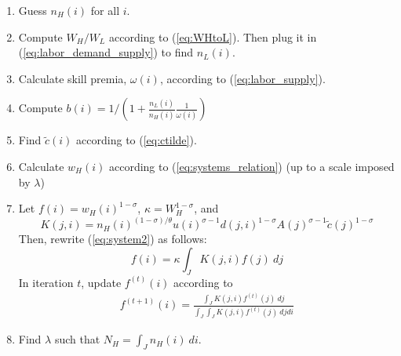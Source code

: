 \documentclass{article}
\begin{document}
\begin{enumerate}
\item Guess $n_H(i)$ for all $i$.
\item Compute $W_H/W_L$ according to (\ref{eq:WHtoL}). Then plug it in (\ref{eq:labor_demand_supply}) to find $n_L(i)$.
\item Calculate skill premia, $\omega(i)$, according to (\ref{eq:labor_supply}).
\item Compute $b(i)
= 1/(1 + \frac{n_L(i)}{n_H(i)} \frac{1}{\omega(i)})$
\item Find $\tilde{c}(i)$ according to (\ref{eq:ctilde}).
\item Calculate $w_H(i)$ according to (\ref{eq:systems_relation}) (up to a scale imposed by $\lambda$)
\item Let $f(i)=w_H(i)^{1-\sigma}$, $\kappa=W_H^{1-\sigma}$, and
\[
K(j,i) = n_H(i)^{(1-\sigma)/\theta}u(i)^{\sigma-1} d(j,i)^{1-\sigma} A(j)^{\sigma-1} \tilde{c}(j)^{1-\sigma}
\]
Then, rewrite (\ref{eq:system2}) as follows:
\[
f(i) = \kappa \int_J K(j,i) f(j)~dj
\]
In iteration $t$, update $f^{(t)}(i)$ according to
\begin{eqnarray}
	f^{(t+1)}(i) = \frac{\int_J K(j,i) f^{(t)}(j)~dj}{\int_J \int_J K(j,i) f^{(t)}(j)~dj di}
\end{eqnarray}
\item Find $\lambda$ such that $N_H=\int_J n_H(i)~di$.
\end{enumerate}

\newpage



\end{document}
